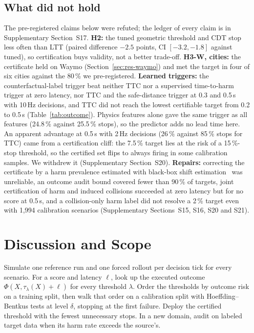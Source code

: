 \documentclass[lettersize,journal]{IEEEtran}
\begin{document}
\subsection{What did not hold}
\label{sec:res-negative}
The pre-registered claims below were refuted; the ledger of every claim is in
Supplementary Section~S17. \textbf{H2:} the tuned geometric threshold and CDT
stop less often than LTT (paired difference $-2.5$ points, CI $[-3.2,-1.8]$
against tuned), so certification buys validity, not a better trade-off.
\textbf{H3-W, cities:} the certificate held on Waymo
(Section~\ref{sec:res-waymo}) and met the target in four of six cities against
the 80\,\% we pre-registered. \textbf{Learned triggers:} the
counterfactual-label trigger beat neither TTC nor a supervised time-to-harm
trigger at zero latency, nor TTC and the safe-distance trigger at 0.3 and
0.5\,s with 10\,Hz decisions, and TTC did not reach the lowest certifiable
target from 0.2 to 0.5\,s (Table~\ref{tab:outcome}). Physics features alone
gave the same trigger as all features (24.8\,\% against 25.5\,\% stops), so
the predictor adds no lead time here. An apparent advantage at 0.5\,s with
2\,Hz decisions (26\,\% against 85\,\% stops for TTC) came from a certification
cliff: the 7.5\,\% target lies at the risk of a 15\,\%-stop threshold, so the
certified set flips to always firing in some calibration samples. We withdrew
it (Supplementary Section~S20). \textbf{Repairs:} correcting the certificate by
a harm prevalence estimated with black-box shift estimation~\cite{lipton2018}
was unreliable, an outcome audit bound covered fewer than 90\,\% of targets,
joint certification of harm and induced collisions succeeded at zero latency
but for no score at 0.5\,s, and a collision-only harm label did not resolve a
2\,\% target even with 1{,}994 calibration scenarios (Supplementary
Sections~S15, S16, S20 and S21).

\section{Discussion and Scope}
\label{sec:discussion}
\begin{algorithm}[t]
\caption{Certifying the outcome of a fallback trigger}
\label{alg:recipe}
\small
\begin{algorithmic}[1]
\STATE Simulate one reference run and one forced rollout per decision tick for every scenario.
\STATE For a score and latency $\ell$, look up the executed outcome $\Phi(X,\tau_\lambda(X){+}\ell)$ for every threshold $\lambda$.
\STATE Order the thresholds by outcome risk on a training split, then walk that order on a calibration split with Hoeffding--Bentkus tests at level $\delta$, stopping at the first failure.
\STATE Deploy the certified threshold with the fewest unnecessary stops. In a new domain, audit on labeled target data when its harm rate exceeds the source's.
\end{algorithmic}
\end{algorithm}
\end{document}
